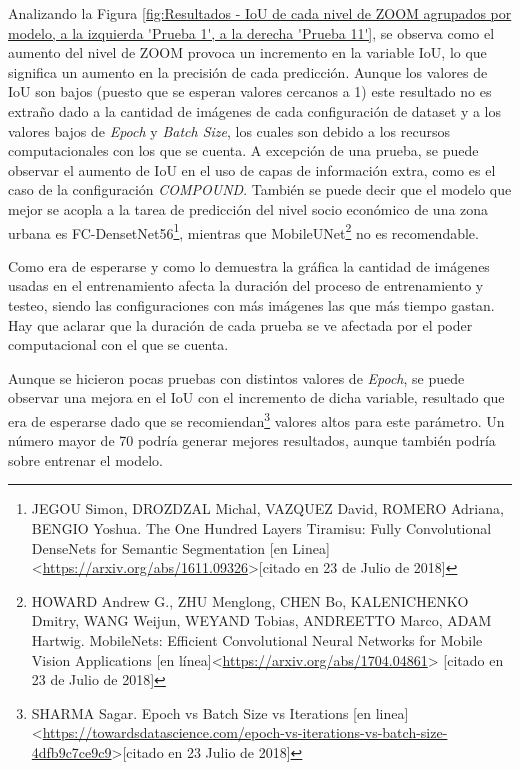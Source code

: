 Analizando la Figura \ref{fig:Resultados - IoU de cada nivel de ZOOM agrupados por modelo, a la izquierda 'Prueba 1', a la derecha 'Prueba 11'}, se observa como el aumento del nivel de ZOOM provoca un incremento en la variable IoU, lo que significa un aumento en la precisión de cada predicción. Aunque los valores de IoU son bajos (puesto que se esperan valores cercanos a 1) este resultado no es extraño dado a la cantidad de imágenes de cada configuración de dataset y a los valores bajos de \textit{Epoch} y \textit{Batch Size}, los cuales son debido a los recursos computacionales con los que se cuenta. A excepción de una prueba, se puede observar el aumento de IoU en el uso de capas de información extra, como es el caso de la configuración \textit{COMPOUND}. También se puede decir que el modelo que mejor se acopla a la tarea de predicción del nivel socio económico de una zona urbana es FC-DensetNet56\footnote[15]{JEGOU Simon, DROZDZAL Michal, VAZQUEZ David, ROMERO Adriana, BENGIO Yoshua. The One Hundred Layers Tiramisu: Fully Convolutional DenseNets for Semantic Segmentation [en Linea]<\url{https://arxiv.org/abs/1611.09326}>[citado en 23 de Julio de 2018]}, mientras que MobileUNet\footnote[16]{HOWARD Andrew G., ZHU Menglong, CHEN Bo, KALENICHENKO Dmitry, WANG Weijun, WEYAND Tobias, ANDREETTO Marco, ADAM Hartwig. MobileNets: Efficient Convolutional Neural Networks for Mobile Vision Applications [en línea]<\url{https://arxiv.org/abs/1704.04861}> [citado en 23 de Julio de 2018]} no es recomendable. 


Como era de esperarse y como lo demuestra la gráfica la cantidad de imágenes usadas en el entrenamiento afecta la duración del proceso de entrenamiento y testeo, siendo las configuraciones con más imágenes las que más tiempo gastan. Hay que aclarar que la duración de cada prueba se ve afectada por el poder computacional con el que se cuenta.



Aunque se hicieron pocas pruebas con distintos valores de \textit{Epoch}, se puede observar una mejora en el IoU con el incremento de dicha variable, resultado que era de esperarse dado que se recomiendan\footnote[18]{SHARMA Sagar. Epoch vs Batch Size vs Iterations [en linea]<\url{https://towardsdatascience.com/epoch-vs-iterations-vs-batch-size-4dfb9c7ce9c9}>[citado en 23 Julio de 2018]} valores altos para este parámetro. Un número mayor de 70 podría generar mejores resultados, aunque también podría sobre entrenar el modelo. 

